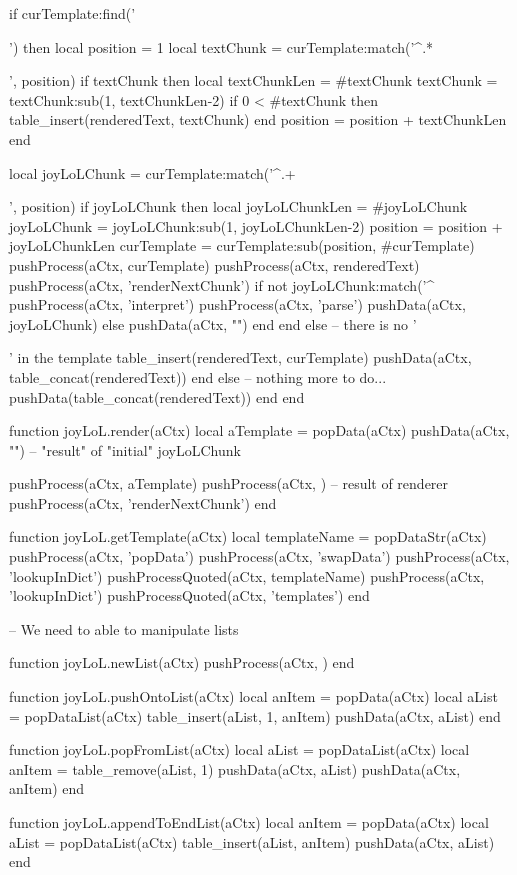     if curTemplate:find('{{') then
      local position  = 1
      local textChunk = curTemplate:match('^.*{{', position)
      if textChunk then 
        local textChunkLen = #textChunk
        textChunk = textChunk:sub(1, textChunkLen-2)
        if 0 < #textChunk then table_insert(renderedText, textChunk) end
        position = position + textChunkLen
      end
      
      local joyLoLChunk = curTemplate:match('^.+}}', position)
      if joyLoLChunk then
        local joyLoLChunkLen = #joyLoLChunk
        joyLoLChunk = joyLoLChunk:sub(1, joyLoLChunkLen-2)
        position = position + joyLoLChunkLen
        curTemplate = curTemplate:sub(position, #curTemplate)
        pushProcess(aCtx, curTemplate)
        pushProcess(aCtx, renderedText)
        pushProcess(aCtx, 'renderNextChunk')
        if not joyLoLChunk:match('^%
          pushProcess(aCtx, 'interpret')
          pushProcess(aCtx, 'parse')
          pushData(aCtx, joyLoLChunk)
        else
          pushData(aCtx, "")
        end
      end
    else -- there is no '{{' in the template
      table_insert(renderedText, curTemplate)
      pushData(aCtx, table_concat(renderedText))
    end
  else
    -- nothing more to do...
    pushData(table_concat(renderedText))
  end
end

function joyLoL.render(aCtx)
  local aTemplate = popData(aCtx)
  pushData(aCtx, "")    -- "result" of "initial" joyLoLChunk

  pushProcess(aCtx, aTemplate)
  pushProcess(aCtx, {}) -- result of renderer
  pushProcess(aCtx, 'renderNextChunk')
end

function joyLoL.getTemplate(aCtx)
  local templateName = popDataStr(aCtx)
  pushProcess(aCtx, 'popData')
  pushProcess(aCtx, 'swapData')
  pushProcess(aCtx, 'lookupInDict')
  pushProcessQuoted(aCtx, templateName)
  pushProcess(aCtx, 'lookupInDict')
  pushProcessQuoted(aCtx, 'templates')
end

-- We need to able to manipulate lists

function joyLoL.newList(aCtx)
  pushProcess(aCtx, {})
end

function joyLoL.pushOntoList(aCtx)
  local anItem = popData(aCtx)
  local aList  = popDataList(aCtx)
  table_insert(aList, 1, anItem)
  pushData(aCtx, aList)
end

function joyLoL.popFromList(aCtx)
  local aList = popDataList(aCtx)
  local anItem = table_remove(aList, 1)
  pushData(aCtx, aList)
  pushData(aCtx, anItem)
end

function joyLoL.appendToEndList(aCtx)
  local anItem = popData(aCtx)
  local aList  = popDataList(aCtx)
  table_insert(aList, anItem)
  pushData(aCtx, aList)
end

}}}}
